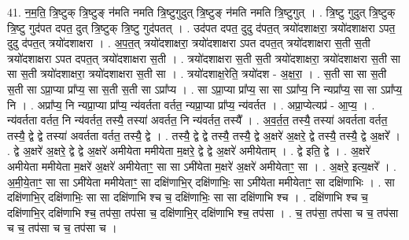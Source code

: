 \documentclass[17pt]{extarticle}
\begin{document}
41. न॒म॒ति॒ त्रि॒ष्टुक् त्रि॒ष्टुङ् न॑मति नमति त्रि॒ष्टुगुदुत् त्रि॒ष्टुङ् न॑मति नमति त्रि॒ष्टुगुत् । . त्रि॒ष्टु गुदुत् त्रि॒ष्टुक् त्रि॒ष्टु गुद॑पत दपत॒ दुत् त्रि॒ष्टुक् त्रि॒ष्टु गुद॑पतत् । . उद॑पत दपत॒ दुदु द॑पत॒त् त्रयो॑दशाक्षरा॒ त्रयो॑दशाक्षरा ऽपत॒ दुदु द॑पत॒त् त्रयो॑दशाक्षरा । . अ॒प॒त॒त् त्रयो॑दशाक्षरा॒ त्रयो॑दशाक्षरा ऽपत दपत॒त् त्रयो॑दशाक्षरा स॒ती स॒ती त्रयो॑दशाक्षरा ऽपत दपत॒त् त्रयो॑दशाक्षरा स॒ती । . त्रयो॑दशाक्षरा स॒ती स॒ती त्रयो॑दशाक्षरा॒ त्रयो॑दशाक्षरा स॒ती सा सा स॒ती त्रयो॑दशाक्षरा॒ त्रयो॑दशाक्षरा स॒ती सा । . त्रयो॑दशाक्ष॒रेति॒ त्रयो॑दश - अ॒क्ष॒रा॒ । . स॒ती सा सा स॒ती स॒ती सा ऽप्रा॒प्या प्रा᳚प्य॒ सा स॒ती स॒ती सा ऽप्रा᳚प्य । . सा ऽप्रा॒प्या प्रा᳚प्य॒ सा सा ऽप्रा᳚प्य॒ नि न्यप्रा᳚प्य॒ सा सा ऽप्रा᳚प्य॒ नि । . अप्रा᳚प्य॒ नि न्यप्रा॒प्या प्रा᳚प्य॒ न्य॑वर्तता वर्तत॒ न्यप्रा॒प्या प्रा᳚प्य॒ न्य॑वर्तत । . अप्रा॒प्येत्यप्र॑ - आ॒प्य॒ । . न्य॑वर्तता वर्तत॒ नि न्य॑वर्तत॒ तस्यै॒ तस्या॑ अवर्तत॒ नि न्य॑वर्तत॒ तस्यै᳚ । . अ॒व॒र्त॒त॒ तस्यै॒ तस्या॑ अवर्तता वर्तत॒ तस्यै॒ द्वे द्वे तस्या॑ अवर्तता वर्तत॒ तस्यै॒ द्वे । . तस्यै॒ द्वे द्वे तस्यै॒ तस्यै॒ द्वे अ॒क्षरे॑ अ॒क्षरे॒ द्वे तस्यै॒ तस्यै॒ द्वे अ॒क्षरे᳚ । . द्वे अ॒क्षरे॑ अ॒क्षरे॒ द्वे द्वे अ॒क्षरे॑ अमीयेता ममीयेता म॒क्षरे॒ द्वे द्वे अ॒क्षरे॑ अमीयेताम् । . द्वे इति॒ द्वे । . अ॒क्षरे॑ अमीयेता ममीयेता म॒क्षरे॑ अ॒क्षरे॑ अमीयेताꣳ॒॒ सा सा ऽमी॑येता म॒क्षरे॑ अ॒क्षरे॑ अमीयेताꣳ॒॒ सा । . अ॒क्षरे॒ इत्य॒क्षरे᳚ । . अ॒मी॒ये॒ताꣳ॒॒ सा सा ऽमी॑येता ममीयेताꣳ॒॒ सा दक्षि॑णाभि॒र् दक्षि॑णाभिः॒ सा ऽमी॑येता ममीयेताꣳ॒॒ सा दक्षि॑णाभिः । . सा दक्षि॑णाभि॒र् दक्षि॑णाभिः॒ सा सा दक्षि॑णाभि श्च च॒ दक्षि॑णाभिः॒ सा सा दक्षि॑णाभि श्च । . दक्षि॑णाभि श्च च॒ दक्षि॑णाभि॒र् दक्षि॑णाभि श्च॒ तप॑सा॒ तप॑सा च॒ दक्षि॑णाभि॒र् दक्षि॑णाभि श्च॒ तप॑सा । . च॒ तप॑सा॒ तप॑सा च च॒ तप॑सा च च॒ तप॑सा च च॒ तप॑सा च । \newline
\pagebreak
{}
\end{document}
